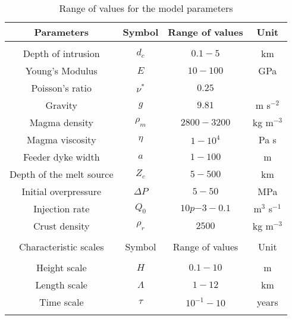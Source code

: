 \begin{table}
  \caption{Range of values for the model parameters}
  \centering
  \begin{tabular}{c|c|c|c}
    \hline
    Parameters& Symbol & Range of values &Unit\\
    \hline
              &&\\
    Depth of intrusion & $d_c$ & $0.1-5$ &km \\
    Young's Modulus & $E$ & $10-100$ &GPa \\
    Poisson's ratio & $\nu^*$ & $0.25$ &\\
    Gravity & $g$ & $9.81$ &m s$^{-2}$ \\
    Magma density & $\rho_{m}$ & $2800-3200$ &kg m$^{-3}$ \\
    Magma viscosity & $\eta $ & $1-10^{4}$ &Pa s \\
    Feeder dyke width & $a$ & $1-100$ &m \\
    Depth of the melt source & $Z_{c}$ & $ 5-500$& km \\ 
    Initial overpressure & $\Delta P$ & $5-50$ &MPa \\
    Injection rate & $Q_{0}$ &$10p{-3}-0.1$ &m$^{3}$ s$^{-1}$ \\
    Crust density & $\rho_{r}$ & $2500$ &kg m$^{-3}$ \\
              &&\\
    \hline
    Characteristic scales & Symbol & Range of values & Unit\\
    \hline
              &&\\
    Height scale & $H$& $0.1-10$ &m \\
    Length scale & $\Lambda$ & $1-12$& km \\
    Time scale & $\tau$ & $10^{-1}-10$ &years \\
                                              \label{tab2}
  \end{tabular} 
\end{table}
